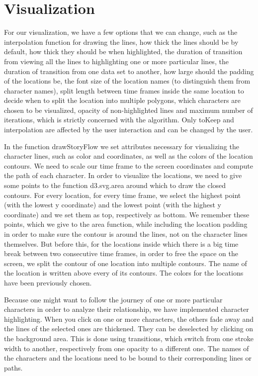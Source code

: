 \documentclass{report}
\begin{document}
\section{Visualization}
\par
For our visualization, we have a few options that we can change, such as the interpolation function for drawing the lines, how thick the lines should be by default, how thick they should be when highlighted, the duration of transition from viewing all the lines to highlighting one or more particular lines, the duration of transition from one data set to another, how large should the padding of the locations be, the font size of the location names (to distinguish them from character names), split length between time frames inside the same location to decide when to split the location into multiple polygons, which characters are chosen to be visualized, opacity of non-highlighted lines and maximum number of iterations, which is strictly concerned with the algorithm. Only toKeep and interpolation are affected by the user interaction and can be changed by the user.
\par
In the function drawStoryFlow we set attributes necessary for visualizing the character lines, such as color and coordinates, as well as the colors of the location contours. We need to scale our time frame to the screen coordinates and compute the path of each character.
In order to visualize the locations, we need to give some points to the function d3.svg.area around which to draw the closed contours. For every location, for every time frame, we select the highest point (with the lowest y coordinate) and the lowest point (with the highest y coordinate) and we set them as top, respectively as bottom. We remember these points, which we give to the area function, while including the location padding in order to make sure the contour is around the lines, not on the character lines themselves. But before this, for the locations inside which there is a big time break between two consecutive time frames, in order to free the space on the screen, we split the contour of one location into multiple contours. The name of the location is written above every of its contours. The colors for the locations have been previously chosen.
\par
Because one might want to follow the journey of one or more particular characters in order to analyze their relationship, we have implemented character highlighting. When you click on one or more characters, the others fade away and the lines of the selected ones are thickened. They can be deselected by clicking on the background area. This is done using transitions, which switch from one stroke width to another, respectively from one opacity to a different one. The names of the characters and the locations need to be bound to their corresponding lines or paths.
\end{document}
